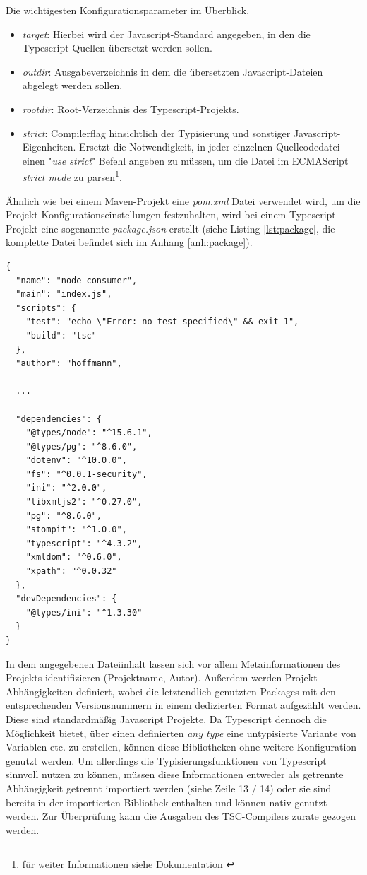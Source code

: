 Die wichtigesten Konfigurationsparameter im Überblick.

\begin{itemize}
  \item \emph{target}: Hierbei wird der Javascript-Standard angegeben, in den die Typescript-Quellen übersetzt werden sollen.
  \item \emph{outdir}: Ausgabeverzeichnis in dem die übersetzten Javascript-Dateien abgelegt werden sollen.
  \item \emph{rootdir}: Root-Verzeichnis des Typescript-Projekts.
  \item \emph{strict}: Compilerflag hinsichtlich der Typisierung und sonstiger Javascript-Eigenheiten. Ersetzt die Notwendigkeit, in jeder einzelnen Quellcodedatei einen "\emph{use strict}" Befehl angeben zu müssen, um die Datei im ECMAScript \emph{strict mode} zu parsen\footnote{für weiter Informationen siehe Dokumentation \cite[Kapitel~tsconfig]{typescript-doc}}.
\end{itemize}

Ähnlich wie bei einem Maven-Projekt eine \emph{pom.xml} Datei verwendet wird, um die Projekt-Konfigurationseinstellungen festzuhalten, wird bei einem Typescript-Projekt eine sogenannte \emph{package.json} erstellt (siehe Listing \ref{lst:package}, die komplette Datei befindet sich im Anhang \ref{anh:package}).


\begin{lstlisting}[style=javaStyle,caption={Typescript - package.json},label=lst:package]
  {
  "name": "node-consumer",
  "main": "index.js",
  "scripts": {
    "test": "echo \"Error: no test specified\" && exit 1",
    "build": "tsc"
  },
  "author": "hoffmann",

  ...

  "dependencies": {
    "@types/node": "^15.6.1",
    "@types/pg": "^8.6.0",
    "dotenv": "^10.0.0",
    "fs": "^0.0.1-security",
    "ini": "^2.0.0",
    "libxmljs2": "^0.27.0",
    "pg": "^8.6.0",
    "stompit": "^1.0.0",
    "typescript": "^4.3.2",
    "xmldom": "^0.6.0",
    "xpath": "^0.0.32"
  },
  "devDependencies": {
    "@types/ini": "^1.3.30"
  }
}
\end{lstlisting}

In dem angegebenen Dateiinhalt lassen sich vor allem Metainformationen des Projekts identifizieren (Projektname, Autor). Außerdem werden Projekt-Abhängigkeiten definiert, wobei die letztendlich genutzten Packages mit den entsprechenden Versionsnummern in einem dedizierten Format aufgezählt werden. Diese sind standardmäßig Javascript Projekte. Da Typescript dennoch die Möglichkeit bietet, über einen definierten \emph{any type} eine untypisierte Variante von Variablen etc. zu erstellen, können diese Bibliotheken ohne weitere Konfiguration genutzt werden. Um allerdings die Typisierungsfunktionen von Typescript sinnvoll nutzen zu können, müssen diese Informationen entweder als getrennte Abhängigkeit getrennt importiert werden (siehe Zeile 13 / 14) oder sie sind bereits in der importierten Bibliothek enthalten und können nativ genutzt werden. Zur Überprüfung kann die Ausgaben des TSC-Compilers zurate gezogen werden.

